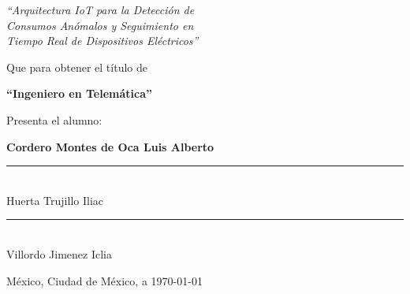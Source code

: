 \documentclass{report}
\theoremstyle{mytheoremstyle}
\theoremstyle{mytheoremstyle}
\theoremstyle{myproblemstyle}
\begin{document}
\begin{titlepage}
\begin{flushright}
\begin{minipage}{0.85\textwidth}
\begin{center}
            {\large\itshape ``Arquitectura IoT para la Detección de\\
            Consumos Anómalos y Seguimiento en\\
            Tiempo Real de Dispositivos Eléctricos''}\par
            \vspace{1.5cm}
            
            {\large Que para obtener el título de}\par
            \vspace{0.5cm}
            {\large\bfseries``Ingeniero en Telemática''}\par
            \vspace{1.5cm}
            
            {\large Presenta el alumno:}\par
            \vspace{0.5cm}
            {\large\bfseries Cordero Montes de Oca Luis Alberto}\par
            \vspace{1.5cm}
            
            \begin{minipage}{0.45\textwidth}
                \centering
                \rule{6cm}{0.4pt}\\
                {\large Huerta Trujillo Iliac}
            \end{minipage}
            \hfill
            \begin{minipage}{0.45\textwidth}
                \centering
                \rule{6cm}{0.4pt}\\
                {\large Villordo Jimenez Iclia}
            \end{minipage}
            
            \vfill
            \vspace{2cm}   %
            {\large México, Ciudad de México, a \today}\par
        \end{center}
    \end{minipage}
    \end{flushright}

\end{titlepage}

\restoregeometry

\tableofcontents

\listoftables

\listoffigures

\chapter{}  
\end{document}
